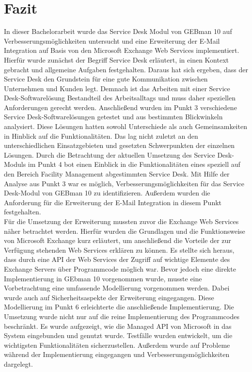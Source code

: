 \section{Fazit}

\noindent
In dieser Bachelorarbeit wurde das Service Desk Modul von GEBman 10 auf Verbesserungsmöglichkeiten untersucht und eine Erweiterung der E-Mail Integration auf Basis von den Microsoft Exchange Web Services implementiert. Hierfür wurde zunächst der Begriff Service Desk erläutert, in einen Kontext gebracht und allgemeine Aufgaben festgehalten. Daraus hat sich ergeben, dass der Service Desk den Grundstein für eine gute Kommunikation zwischen Unternehmen und Kunden legt. Demnach ist das Arbeiten mit einer Service Desk-Softwarelösung Bestandteil des Arbeitsalltags und muss daher speziellen Anforderungen gerecht werden.\newline
Anschließend wurden im Punkt 3 verschiedene Service Desk-Softwarelösungen getestet und aus bestimmten Blickwinkeln analysiert. Diese Lösungen hatten sowohl Unterschiede als auch Gemeinsamkeiten in Hinblick auf die Funktionalitäten. Das lag nicht zuletzt an den unterschiedlichen Einsatzgebieten und gesetzten Schwerpunkten der einzelnen Lösungen.\newline
Durch die Betrachtung der aktuellen Umsetzung des Service Desk-Moduls im Punkt 4 bot einen Einblick in die Funktionalitäten eines speziell auf den Bereich Facility Management abgestimmten Service Desk. Mit Hilfe der Analyse aus Punkt 3 war es möglich, Verbesserungsmöglichkeiten für das Service Desk-Modul von GEBman 10 zu identifizieren. Außerdem wurden die Anforderung für die Erweiterung der E-Mail Integration in diesem Punkt festgehalten. \\

\noindent
Für die Umsetzung der Erweiterung mussten zuvor die Exchange Web Services näher betrachtet werden. Hierfür wurden die Grundlagen und die Funktionsweise von Microsoft Exchange kurz erläutert, um anschließend die Vorteile der zur Verfügung stehenden Web Services erklären zu können. Es stellte sich heraus, dass durch eine API der Web Services der Zugriff auf wichtige Elemente des Exchange Servers über Programmcode möglich war. Bevor jedoch eine direkte Implementierung in GEbman 10 vorgenommen wurde, musste eine Vorbetrachtung eine umfassende Modellierung vorgenommen werden. Dabei wurde auch auf Sicherheitsaspekte der Erweiterung eingegangen. Diese Modellierung im Punkt 6 erleichterte die anschließende Implementierung.\newline
Die Umsetzung wurde nicht nur auf die reine Implementierung des Programmcodes beschränkt. Es wurde aufgezeigt, wie die Managed API von Microsoft in das System eingebunden und genutzt wurde. Testfälle wurden entwickelt, um die wichtigsten Funktionalitäten sicherzustellen.  Außerdem wurde auf Probleme während der Implementierung eingegangen und Verbesserungsmöglichkeiten dargelegt.\\\\

